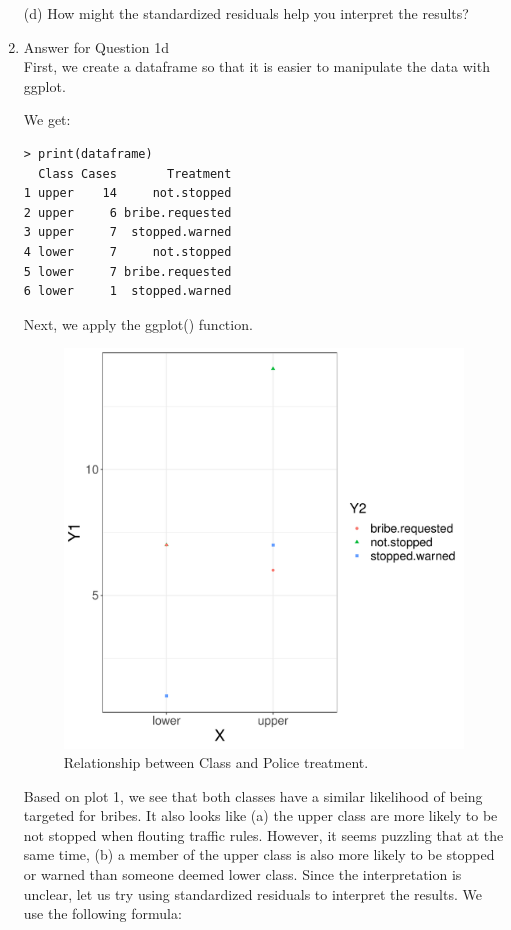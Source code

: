 \documentclass[12pt,letterpaper]{article}
\begin{document}
\begin{enumerate}
	\vspace{7cm}
	\item [(d)] How might the standardized residuals help you interpret the results?  
	
			\item
Answer for Question 1d\\
\noindent First, we create a dataframe so that it is easier to manipulate the data with ggplot.\\
\vspace{.5cm}
  
\vspace{.5cm}
\noindent We get:\\
\begin{verbatim}
> print(dataframe)
  Class Cases       Treatment
1 upper    14     not.stopped
2 upper     6 bribe.requested
3 upper     7  stopped.warned
4 lower     7     not.stopped
5 lower     7 bribe.requested
6 lower     1  stopped.warned
\end{verbatim}
\noindent Next, we apply the ggplot() function.\\
\vspace{.5cm}
  
\vspace{.5cm}
\begin{figure}[hbtp!]\centering
	\caption{\footnotesize Relationship between Class and Police treatment.}
	\label{fig:plot_1}
	\includegraphics[width=.75\textwidth]{plot_class_treatment.pdf}
\end{figure}
\noindent Based on plot 1, we see that both classes have a similar likelihood of being targeted for bribes. It also looks like (a) the upper class are more likely to be not stopped when flouting traffic rules. However, it seems puzzling that at the same time, (b) a member of the upper class is also more likely to be stopped or warned than someone deemed lower class. Since the interpretation is unclear, let us try using standardized residuals to interpret the results. We use the following formula:\\

\end{enumerate}
\end{document}

